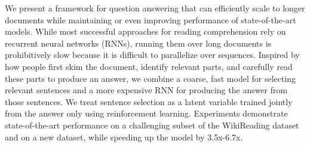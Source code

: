 We present a framework for question answering that can efficiently scale to longer documents while maintaining or even improving performance of state-of-the-art models. While most successful approaches for reading comprehension rely on recurrent neural networks (RNNs), running them over long documents is prohibitively slow because it is difficult to parallelize over sequences. Inspired by how people first skim the document, identify relevant parts, and carefully read these parts to produce an answer, we combine a coarse, fast model for selecting relevant sentences and a more expensive RNN for producing the answer from those sentences. We treat sentence selection as a latent variable trained jointly from the answer only using reinforcement learning. Experiments demonstrate state-of-the-art performance on a challenging subset of the WikiReading dataset and on a new dataset, while speeding up the model by 3.5x-6.7x.
